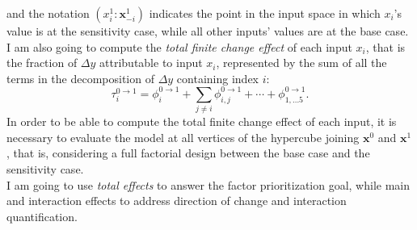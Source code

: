 and the notation $(x_i^1 : \mathbf{x}_{-i}^1)$ indicates the point in the input space in which $x_i$'s value is at the sensitivity case, while all other inputs' values are at the base case.
I am also going to compute the \textit{total finite change effect} of each input $x_i$, that is the fraction of $\Delta y$ attributable to input $x_i$, represented by the sum of all the terms in the decomposition of $\Delta y$ containing index $i$:
\[
\tau_i^{0 \rightarrow 1} =  \phi_i^{0 \rightarrow 1} + \sum_{j \neq i}  \phi_{i,j}^{0 \rightarrow 1} + \cdots + \phi_{1,...5}^{0 \rightarrow 1}.
\]
In order to be able to compute the total finite change effect of each input, it is necessary to evaluate the model at all vertices of 
the hypercube joining $\textbf{x}^0$ and $\textbf{x}^1$, that is, considering a full factorial design between the base case and the sensitivity case. \\
I am going to use \textit{total effects} to answer the factor prioritization goal, while main and interaction effects to address direction of change and interaction quantification.


